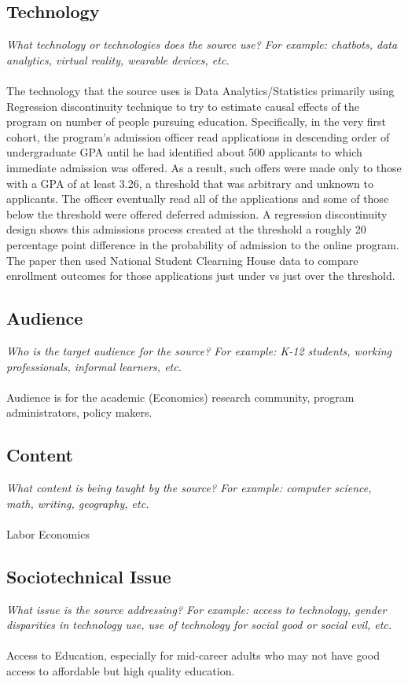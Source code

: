 \documentclass[12pt, final]{article}
\begin{document}
\subsection{Technology}
\textit{What technology or technologies does the source use? For example: chatbots, data analytics, virtual reality, wearable devices, etc.}
\\
\\
The technology that the source uses is Data Analytics/Statistics primarily using Regression discontinuity technique to try to estimate causal effects of the program on number of people pursuing education. Specifically, in the very first cohort, the program's  admission officer read applications in descending order of undergraduate GPA until he had identified about 500 applicants to which immediate admission was offered. As a result, such offers were made only to those with a GPA of at least 3.26, a threshold that was arbitrary and unknown to applicants. The officer eventually read all of the applications and some of those below the threshold were offered deferred admission. A regression discontinuity design shows this admissions process created at the threshold a roughly 20 percentage point difference in the probability
of admission to the online program. The paper then used National Student Clearning House data to compare enrollment outcomes for those applications just under vs just over the threshold. 

\subsection{Audience}
\textit{Who is the target audience for the source? For example: K-12 students, working professionals, informal learners, etc.}
\\
\\
Audience is for the academic (Economics) research community, program administrators, policy makers.

\subsection{Content}
\textit{What content is being taught by the source? For example: computer science, math, writing, geography, etc.}
\\
\\
Labor Economics

\subsection{Sociotechnical Issue}
\textit{What issue is the source addressing? For example: access to technology, gender disparities in technology use, use of technology for social good or social evil, etc.}
\\
\\
Access to Education, especially for mid-career adults who may not have good access to affordable but high quality education.
\end{document}
